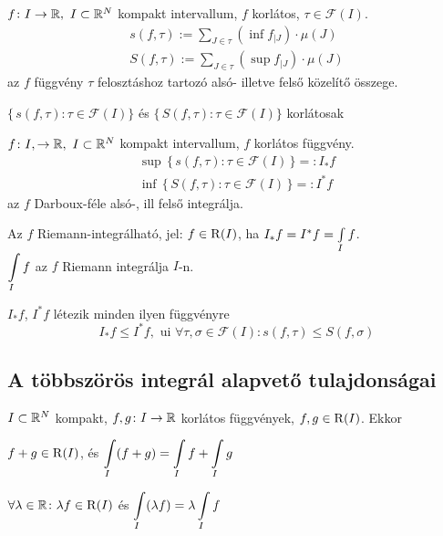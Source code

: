 \begin{de}
  $f\colon I\to\mathbb{R},\ I\subset \mathbb{R}^N$ kompakt intervallum, $f$ korlátos, $\tau\in\mathcal{F}(I)$.
  \begin{gather*}
    s(f,\tau):=\sum_{J\in\tau}(\inf f_{|J})\cdot \mu(J)\\
    S(f,\tau) :=\sum_{J\in\tau}(\sup f_{|J})\cdot \mu(J)
  \end{gather*}
  az $f$ függvény $\tau$ felosztáshoz tartozó alsó- illetve felső közelítő összege.
\end{de}
\begin{megj}
$\{\,s(f,\tau):\tau\in\mathcal{F}(I)\}$ és $\{\,S(f,\tau):\tau\in\mathcal{F}(I)\}$ korlátosak
\end{megj}
\begin{de}
  $f\colon I,\to \mathbb{R},\ I\subset \mathbb{R}^N$ kompakt intervallum, $f$ korlátos függvény.
  \begin{gather*}
    \sup\, \{\,s(f,\tau):\tau\in\mathcal{F}(I)\,\} =: I_*f\\
    \inf\, \{\,S(f,\tau):\tau\in\mathcal{F}(I)\,\} =: I^*f
  \end{gather*}
  az $f$ Darboux-féle alsó-, ill felső integrálja.
\end{de}

\begin{de}Az $f$ Riemann-integrálható, jel: $f\in\operatorname{R}(I)$, ha $I_*f=I^*f=\Int_If$.\\
  $\di\Int_If$ az $f$ Riemann integrálja $I$-n.
\end{de}

\begin{megj}$I_*f$, $I^*f$ létezik minden ilyen függvényre
\[I_*f\leq I^*f,\text{ ui }\forall\tau,\sigma\in\mathcal{F}(I)\colon s(f,\tau)\leq S(f,\sigma)\]
\end{megj}

\subsection{A többszörös integrál alapvető tulajdonságai}
\begin{te}
  $I\subset\mathbb{R}^N$ kompakt, $f,g\colon I\to\mathbb{R}$ korlátos függvények, $f,g\in\operatorname{R}(I)$. Ekkor
\begin{enumzjb}
  \item $f+g\in\operatorname{R}(I)$, és $\di\Int_I (f+g) = \Int_I f + \Int_I g$
  \item $\forall \lambda\in\mathbb{R}\colon \lambda f\in\operatorname{R}(I)$ és $\di\Int_I(\lambda f)=\lambda\Int_I f$
\end{enumzjb}
\end{te}

